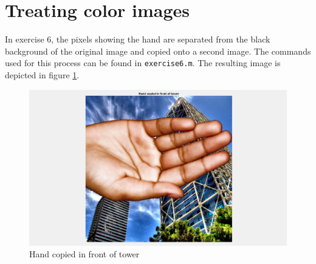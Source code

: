 \section{Treating color images}

In exercise 6, the pixels showing the hand are separated from the black background of the original image and copied onto a second image. The commands used for this process can be found in \texttt{exercise6.m}. The resulting image is depicted in figure \ref{fig:task22}.

\begin{figure}[!hbt]
  \includegraphics[width=\textwidth]{./img/task22.png}
  \caption{Hand copied in front of tower}
  \label{fig:task22}
\end{figure}
